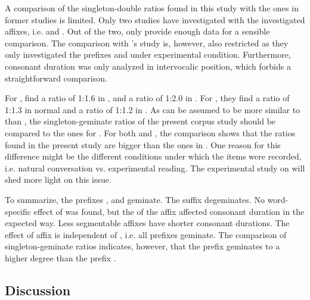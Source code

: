 A comparison of the singleton-double ratios found in this study with the ones in former studies is limited. Only two studies have investigated  with the investigated affixes, i.e. \cite{Kaye.2005} and \cite{Oh.2012}. Out of the two, only \cite{Oh.2012} provide enough data for a sensible comparison. The comparison with \citeauthor{Oh.2012}'s study is, however, also restricted as they only investigated the prefixes  and  under experimental condition. Furthermore, consonant duration was only analyzed in intervocalic position, which forbids a straightforward comparison. 
 
For , \cite{Oh.2012} find a ratio of 1:1.6 in , and a ratio of 1:2.0 in . For , they find a ratio of 1:1.3 in normal and a ratio of 1:1.2 in . 
As  can be assumed to be more similar to  than , the singleton-geminate ratios of the present corpus study should be compared to the ones for . 
For both  and , the comparison shows that the ratios found in the present study are bigger than the ones in \cite{Oh.2012}. 
One reason for this difference might be the different conditions under which the items were recorded, i.e. natural conversation vs. experimental reading. The experimental study on  will shed more light on this issue.

To summarize, the prefixes ,  and  geminate. The suffix  degeminates. No word-specific effect of  was found, but the  of the affix affected consonant duration in the expected way. Less segmentable affixes have shorter consonant durations. The effect of affix is independent of , i.e. all prefixes geminate. The comparison of singleton-geminate ratios indicates, however, that the prefix  geminates to a higher degree than the prefix .

\subsection{Discussion}


